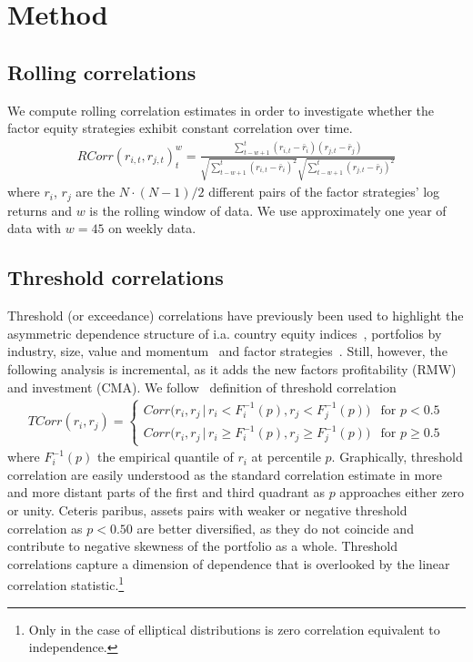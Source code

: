 \section{Method}
\subsection{Rolling correlations}
We compute rolling correlation estimates in order to investigate whether the factor equity strategies exhibit constant correlation over time. 
\begin{align}
    RCorr(r_{i, t}, r_{j, t})_t^{w} = \frac{\sum^{t}_{t-w+1}(r_{i, t} - \bar{r}_i)(r_{j,t} - \bar{r}_j)}{\sqrt{\sum^{t}_{t-w+1} (r_{i,t} - \bar{r}_i)^2} \sqrt{\sum^{t}_{t-w+1} (r_{j,t} - \bar{r}_j)^2}}
\end{align}
where $r_i$, $r_j$ are the $N \cdot (N-1) / 2$ different pairs of the factor strategies' log returns and $w$ is the rolling window of data. We use approximately one year of data with $w = 45$ on weekly data.
\subsection{Threshold correlations}
Threshold (or exceedance) correlations have previously been used to highlight the asymmetric dependence structure of i.a. country equity indices~\autocite{LonginSolnik2001}, portfolios by industry, size, value and momentum~\autocite{AngChen2002} and factor strategies~\autocite{ChristoffersenLanglois2013}. Still, however, the following analysis is incremental, as it adds the new factors profitability (RMW) and investment (CMA). We follow~\textcite{ChristoffersenLanglois2013} definition of threshold correlation
\begin{align}
    TCorr(r_i, r_j) = 
    \begin{cases} 
        Corr\Big(r_i, r_j \,|\, r_i < F_i^{-1}(p), r_j < F_j^{-1}(p)\Big)  & \text{for } p < 0.5 \\
        Corr\Big(r_i, r_j \,|\, r_i \geq F_i^{-1}(p), r_j \geq F_j^{-1}(p)\Big)  & \text{for } p \geq 0.5
    \end{cases}
\end{align}
where $F_i^{-1}(p)$ the empirical quantile of $r_i$ at percentile $p$. Graphically, threshold correlation are easily understood as the standard correlation estimate in more and more distant parts of the first and third quadrant as $p$ approaches either zero or unity. Ceteris paribus, assets pairs with weaker or negative threshold correlation as $p < 0.50$ are better diversified, as they do not coincide and contribute to negative skewness of the portfolio as a whole. Threshold correlations capture a dimension of dependence that is overlooked by the linear correlation statistic.\footnote{Only in the case of elliptical distributions is zero correlation equivalent to independence.} 

